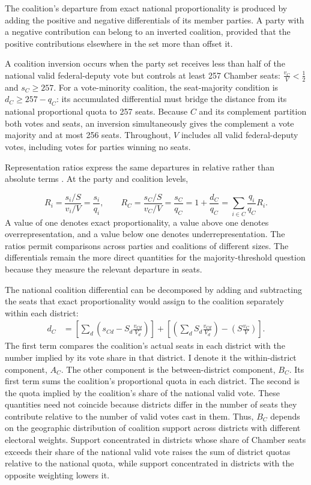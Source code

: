 \documentclass[11pt]{article}
\begin{document}
The coalition's departure from exact national proportionality is produced by
adding the positive and negative differentials of its member parties. A party
with a negative contribution can belong to an inverted coalition, provided that
the positive contributions elsewhere in the set more than offset it.

A coalition inversion occurs when the party set receives less than half of the
national valid federal-deputy vote but controls at least 257 Chamber seats:
\(\frac{v_C}{V}<\frac{1}{2}\) and \(s_C\geq257.\)
For a vote-minority coalition, the seat-majority condition is
$d_C\geq257-q_C$: its accumulated differential must bridge the distance from
its national proportional quota to 257 seats. Because $C$ and its complement
partition both votes and seats, an inversion simultaneously gives the complement
a vote majority and at most 256 seats. Throughout, $V$ includes all valid
federal-deputy votes, including votes for parties winning no seats.


Representation ratios express the same departures in relative rather than absolute terms \parencite{taagepera1980proportionality}. At the party and coalition levels,

\[
R_i=\frac{s_i/S}{v_i/V}=\frac{s_i}{q_i},
\qquad
R_C=\frac{s_C/S}{v_C/V}
=\frac{s_C}{q_C}
=1+\frac{d_C}{q_C}
=\sum_{i\in C}\frac{q_i}{q_C}R_i.
\]
A value of one denotes exact proportionality, a value above one denotes
overrepresentation, and a value below one denotes underrepresentation. The ratios
permit comparisons across parties and coalitions of different sizes. The
differentials remain the more direct quantities for the majority-threshold
question because they measure the relevant departure in seats.


The national coalition differential can be decomposed by adding and subtracting
the seats that exact proportionality would assign to the coalition separately
within each district:
\[
\begin{aligned}
d_C
&=
\left[
\sum_d
\left(
s_{Cd}-S_d\frac{v_{Cd}}{V_d}
\right)
\right]
+
\left[
\left(
\sum_d S_d\frac{v_{Cd}}{V_d}
\right)
-
\left(
S\frac{v_C}{V}
\right)
\right].
\end{aligned}
\]
The first term compares the coalition's actual seats in each district with the
number implied by its vote share in that district. I denote it the
within-district component, \(A_C\). The other component is the between-district
component, \(B_C\). Its first term sums the coalition's proportional quota in
each district. The second is the quota implied by the coalition's share of the
national valid vote. These quantities need not coincide because districts differ
in the number of seats they contribute relative to the number of valid votes
cast in them. Thus, \(B_C\) depends on the geographic distribution of coalition
support across districts with different electoral weights. Support concentrated
in districts whose share of Chamber seats exceeds their share of the national
valid vote raises the sum of district quotas relative to the national quota,
while support concentrated in districts with the opposite weighting lowers it.
\end{document}
